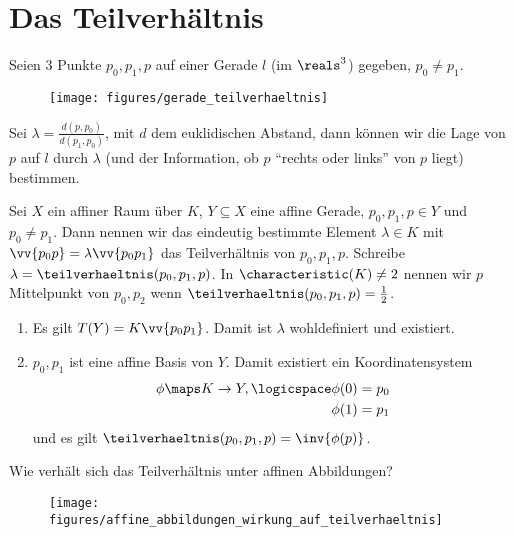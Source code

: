 \section{Das Teilverhältnis}
\begin{idee*}
    Seien 3 Punkte \( p_0,p_1,p \) auf einer Gerade \( l \) (\zb im \( \reals^3 \)) gegeben, \( p_0\neq p_1 \).
    \begin{figure}[H]
        \centering
        \texttt{[image: figures/gerade\_teilverhaeltnis]}
        \caption*{}
        \label{fig:gerade_teilverhaeltnis}
    \end{figure}
    Sei \( \lambda=\frac{d(p,p_0)}{d(p_1,p_0)} \), mit \( d \) dem euklidischen Abstand, dann können wir die Lage von \( p \) auf \( l \) durch \( \lambda \) (und der Information, ob \( p \) \enquote{rechts oder links} von \( p \) liegt) bestimmen.
\end{idee*}
\begin{definition*}
    Sei \( X \) ein affiner Raum über \( K \), \( Y\subseteq X \) eine affine Gerade, \( p_0,p_1,p\in Y \) und \( p_0\neq p_1 \). Dann nennen wir das eindeutig bestimmte Element \( \lambda\in K \) mit \( \vv{p_0 p}=\lambda \vv{p_0 p_1} \) das Teilverhältnis von \( p_0,p_1,p \). Schreibe \( \lambda=\teilverhaeltnis(p_0,p_1,p) \). In \( \characteristic(K)\neq 2 \) nennen wir \( p \) Mittelpunkt von \( p_0,p_2 \) wenn \( \teilverhaeltnis(p_0,p_1,p)=\frac{1}{2} \).
\end{definition*}
\begin{bemerkungen*}
    \begin{enumerate}
        \item Es gilt \( T(Y)=K\vv{p_0p_1} \). Damit ist \( \lambda \) wohldefiniert und existiert.
        \item \( p_0,p_1 \) ist eine affine Basis von \( Y \). Damit existiert ein Koordinatensystem
        \begin{align*}
            \phi\maps K\to Y,\logicspace \begin{aligned}[t]
                \phi(0)&=p_0\\
                \phi(1)&=p_1
            \end{aligned}
        \end{align*}
        und es gilt \( \teilverhaeltnis(p_0,p_1,p)=\inv{\phi(p)} \).
    \end{enumerate}
    
\end{bemerkungen*}
\begin{frage*}
    Wie verhält sich das Teilverhältnis unter affinen Abbildungen?
    \begin{figure}[H]
        \centering
        \texttt{[image: figures/affine\_abbildungen\_wirkung\_auf\_teilverhaeltnis]}
        \label{fig:affine_abbildungen_wirkung_auf_teilverhaeltnis}
    \end{figure}
    
\end{frage*}